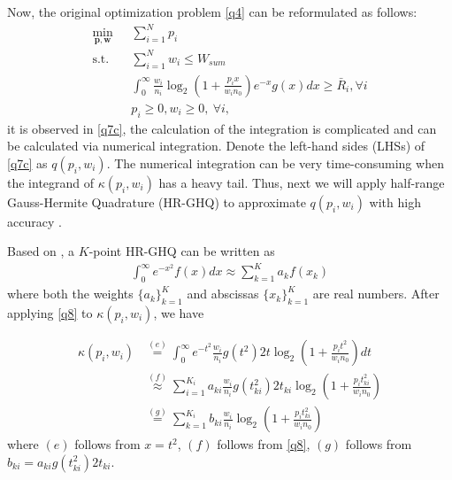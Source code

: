 \documentclass[journal]{IEEEtran}
\begin{document}
Now, the original optimization problem \eqref{q4} can be reformulated as follows:
\begin{subequations}\label{q7}
	\begin{align}
	\min_{\mathbf{p}, \mathbf{w}}\ & \sum\limits_{i = 1}^{N} p_i \label{q7a} \\ \mbox{s.t.} \quad &  \sum\limits_{i = 1}^{N} w_i \leq W_{sum} \label{q7b} \\ \quad &  \int_{0}^{\infty} \frac{w_i}{n_i} \log_2\left(1 + \frac{p_i x}{w_i n_0}\right) e^{-x}g\left(x\right) dx \geq \bar{R}_i, \forall i \label{q7c}\\
	& p_i \geq 0, w_i \geq 0, \ \forall i, \label{q7d}
	\end{align}
\end{subequations}
it is observed in \eqref{q7c}, the calculation of the integration is complicated and can be calculated via numerical integration. Denote the left-hand sides (LHSs) of \eqref{q7c} as $q\left(p_i, w_i\right)$. The numerical integration can be very time-consuming when the integrand of $\kappa\left(p_i, w_i\right)$ has a heavy tail. Thus, next we will apply half-range Gauss-Hermite Quadrature (HR-GHQ) to approximate $q\left(p_i, w_i\right)$ with high accuracy \cite{JSBall,NMSteen}.

Based on \cite{NMSteen}, a $K$-point HR-GHQ can be written as
\begin{align} \label{q8}
\int_{0}^{\infty}e^{-x^2} f\left(x\right) dx \approx \sum\limits_{k = 1}^{K} a_k f\left(x_k\right)
\end{align}
where both the weights $\{a_k\}_{k = 1}^K$ and abscissas $\{x_k\}_{k = 1}^K$ are real numbers. After applying \eqref{q8} to $\kappa \left(p_i, w_i\right)$, we have

\begin{align} \label{q9}
\kappa \left(p_i, w_i\right) &\overset{\left(e\right)}{=} \int_{0}^{\infty}e^{-t^2}\frac{w_i}{n_i} g\left(t^2\right) 2t \log_2\left(1 + \frac{p_it^2}{w_in_0}\right)dt  \nonumber \\
& \overset{\left(f\right)}{\approx} \sum\limits_{i = 1}^{K_i}a_{ki}\frac{w_i}{n_i}g\left(t_{ki}^2\right)2t_{ki}\log_2\left(1 + \frac{p_it_{ki}^2}{w_in_0}\right) \nonumber \\
& \overset{\left(g\right)}{=} \sum\limits_{k = 1}^{K_i}b_{ki}\frac{w_i}{n_i}\log_2\left(1 + \frac{p_it_{ki}^2}{w_in_0}\right)
\end{align}
where $\left(e\right)$ follows from $x = t^2$, $\left(f\right)$ follows from \eqref{q8}, $\left(g\right)$ follows from $b_{ki} = a_{ki}g\left(t_{ki}^2\right)2t_{ki}$.
\end{document}
